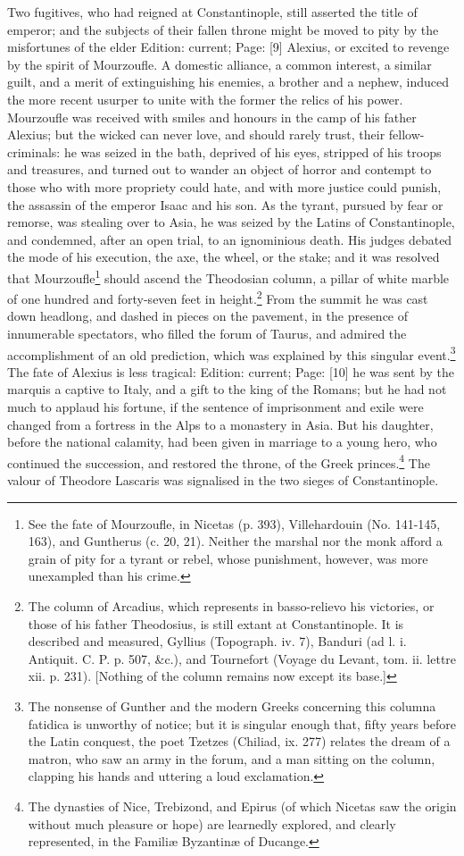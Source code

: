 Two fugitives, who had reigned at Constantinople, still asserted the title of emperor; and the subjects of their fallen throne might be moved to pity by the misfortunes of the elder Edition: current; Page: [9] Alexius, or excited to revenge by the spirit of Mourzoufle. A domestic alliance, a common interest, a similar guilt, and a merit of extinguishing his enemies, a brother and a nephew, induced the more recent usurper to unite with the former the relics of his power. Mourzoufle was received with smiles and honours in the camp of his father Alexius; but the wicked can never love, and should rarely trust, their fellow-criminals: he was seized in the bath, deprived of his eyes, stripped of his troops and treasures, and turned out to wander an object of horror and contempt to those who with more propriety could hate, and with more justice could punish, the assassin of the emperor Isaac and his son. As the tyrant, pursued by fear or remorse, was stealing over to Asia, he was seized by the Latins of Constantinople, and condemned, after an open trial, to an ignominious death. His judges debated the mode of his execution, the axe, the wheel, or the stake; and it was resolved that Mourzoufle\footnote{See the fate of Mourzoufle, in Nicetas (p. 393), Villehardouin (No. 141-145, 163), and Guntherus (c. 20, 21). Neither the marshal nor the monk afford a grain of pity for a tyrant or rebel, whose punishment, however, was more unexampled than his crime.} should ascend the Theodosian column, a pillar of white marble of one hundred and forty-seven feet in height.\footnote{The column of Arcadius, which represents in basso-relievo his victories, or those of his father Theodosius, is still extant at Constantinople. It is described and measured, Gyllius (Topograph. iv. 7), Banduri (ad l. i. Antiquit. C. P. p. 507, \&c.), and Tournefort (Voyage du Levant, tom. ii. lettre xii. p. 231). [Nothing of the column remains now except its base.]} From the summit he was cast down headlong, and dashed in pieces on the pavement, in the presence of innumerable spectators, who filled the forum of Taurus, and admired the accomplishment of an old prediction, which was explained by this singular event.\footnote{The nonsense of Gunther and the modern Greeks concerning this columna fatidica is unworthy of notice; but it is singular enough that, fifty years before the Latin conquest, the poet Tzetzes (Chiliad, ix. 277) relates the dream of a matron, who saw an army in the forum, and a man sitting on the column, clapping his hands and uttering a loud exclamation.} The fate of Alexius is less tragical: Edition: current; Page: [10] he was sent by the marquis a captive to Italy, and a gift to the king of the Romans; but he had not much to applaud his fortune, if the sentence of imprisonment and exile were changed from a fortress in the Alps to a monastery in Asia. But his daughter, before the national calamity, had been given in marriage to a young hero, who continued the succession, and restored the throne, of the Greek princes.\footnote{The dynasties of Nice, Trebizond, and Epirus (of which Nicetas saw the origin without much pleasure or hope) are learnedly explored, and clearly represented, in the Familiæ Byzantinæ of Ducange.} The valour of Theodore Lascaris was signalised in the two sieges of Constantinople. 